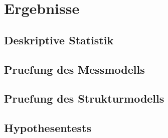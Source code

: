 \chapter{Ergebnisse}\label{chap:ergebnisse}



\section{Deskriptive Statistik}\label{sec:deskriptiv}

\section{Pruefung des Messmodells}\label{sec:messmodell}
\tabReliabilitaet

\section{Pruefung des Strukturmodells}\label{sec:strukturmodell}
\tabPfadkoeffizienten

\section{Hypothesentests}\label{sec:hypothesentests}
